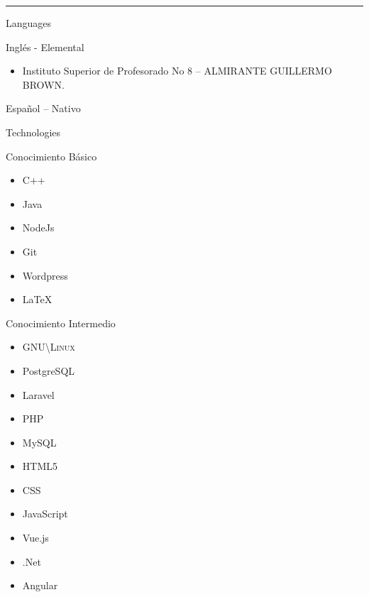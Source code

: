 \documentclass[a4paper,10pt]{article}
\newlength{\cvcolumngapwidth}
\newlength{\cvleftcolumnwidth}
\newlength{\cvrightcolumnwidth}
\newcommand{\cvsectionstyle}[1]{{\normalsize\cvsectionfont\textcolor{cvsectioncolor}{#1}}}
\newcommand{\cvheadingstyle}[1]{{\normalsize\cvheadingfont\textcolor{cvheadingcolor}{#1}}}
\newlength{\cvafteritemskipamount}
\newlength{\cvaftersectionskipamount}
\newlength{\cvparskip}
\newcommand{\cvsection}[1]{
    \begin{minipage}[t]{\cvleftcolumnwidth}
        \raggedleft\cvsectionstyle{#1}
    \end{minipage}%
    \hspace{\cvcolumngapwidth}%
    \begin{minipage}[t]{\cvrightcolumnwidth}
        \textcolor{cvrulecolor}{\rule{\cvrightcolumnwidth}{0.3mm}}
    \end{minipage}

    \vspace{\cvaftersectionskipamount}
}
\newcommand{\cvitem}[2]{
    \begin{minipage}[t]{\cvleftcolumnwidth}
        \raggedleft #1
    \end{minipage}%
    \hspace{\cvcolumngapwidth}%
    \begin{minipage}[t]{\cvrightcolumnwidth}
        \setlength{\parskip}{\cvparskip} #2
    \end{minipage}

    \vspace{\cvafteritemskipamount}
}
\begin{document}

\cvsection{HABILIDADES}

\cvitem{
    \cvheadingstyle{Languages}
}{
    Inglés - Elemental
    \begin{itemize}
        \item Instituto Superior de Profesorado No 8 – ALMIRANTE GUILLERMO BROWN.
    \end{itemize}

    Español – Nativo
}

\cvitem{
    \cvheadingstyle{Technologies}
}{
    Conocimiento Básico
    \begin{multicols}{2}
        \begin{itemize}
            \item C++
            \item Java
            \item NodeJs
            \item Git
            \item Wordpress
            \item LaTeX
        \end{itemize}
    \end{multicols}

    Conocimiento Intermedio
    \begin{multicols}{2}
        \begin{itemize}
            \item \textsc{GNU\textbackslash Linux}
            \item PostgreSQL
            \item Laravel
            \item PHP
            \item MySQL
            \item HTML5
            \item CSS
            \item JavaScript
            \item Vue.js
            \item .Net
            \item Angular
        \end{itemize}
    \end{multicols}
}
\end{document}

